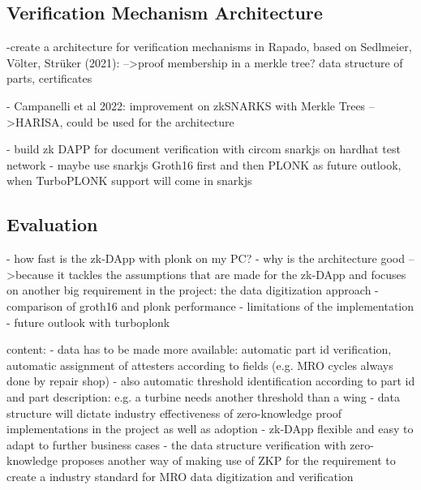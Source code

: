 \subsection{Verification Mechanism Architecture}
-create a architecture for verification mechanisms in Rapado, based on Sedlmeier, Völter, Strüker (2021):
-->proof membership in a merkle tree? data structure of parts, certificates

- Campanelli et al 2022: improvement on zkSNARKS with Merkle Trees -->HARISA, could be used for the architecture

- build zk DAPP for document verification with circom snarkjs on hardhat test network
- maybe use snarkjs Groth16 first and then PLONK as future outlook, when TurboPLONK support will come in snarkjs

\subsection{Evaluation}
- how fast is the zk-DApp with plonk on my PC?
- why is the architecture good -->because it tackles the assumptions that are made for the zk-DApp and focuses on another big requirement in the project: the data digitization approach
- comparison of groth16 and plonk performance
- limitations of the implementation
- future outlook with turboplonk

content:
- data has to be made more available: automatic part id verification, automatic assignment of attesters according to fields (e.g. MRO cycles always done by repair shop)
- also automatic threshold identification according to part id and part description: e.g. a turbine needs another threshold than a wing
- data structure will dictate industry effectiveness of zero-knowledge proof implementations in the project as well as adoption
- zk-DApp flexible and easy to adapt to further business cases
- the data structure verification with zero-knowledge proposes another way of making use of ZKP for the requirement to create a industry standard for MRO data digitization and verification


